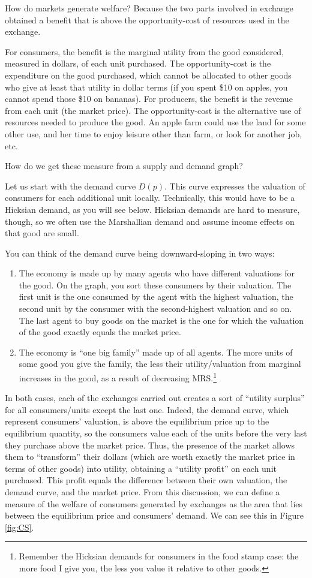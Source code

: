 \documentclass[11pt,english]{article}
\begin{document}
How do markets generate welfare? Because the two parts involved in exchange obtained a benefit that is above the opportunity-cost of resources used in the exchange.

For consumers, the benefit is the marginal utility from the good considered, measured in dollars, of each unit purchased. The opportunity-cost is the expenditure on the good purchased, which cannot be allocated to other goods who give at least that utility in dollar terms (if you spent \$10 on apples, you cannot spend those \$10 on bananas). For producers, the benefit is the revenue from each unit (the market price). The opportunity-cost is the alternative use of resources needed to produce the good. An apple farm could use the land for some other use, and her time to enjoy leisure other than farm, or look for another job, etc.

How do we get these measure from a supply and demand graph? 


Let us start with the demand curve $D(p)$. This curve expresses the valuation of consumers for each additional unit locally. Technically, this would have to be a Hicksian demand, as you will see below. Hicksian demands are hard to measure, though, so we often use the Marshallian demand and assume income effects on that good are small.

 You can think of the demand curve being downward-sloping in two ways:
\begin{enumerate}
	\item The economy is made up by many agents who have different valuations for the good. On the graph, you sort these consumers by their valuation. The first unit is the one consumed by the agent with the highest valuation, the second unit by the consumer with the second-highest valuation and so on. The last agent to buy goods on the market is the one for which the valuation of the good exactly equals the market price.
	\item The economy is ``one big family'' made up of all agents. The more units of some good you give the family, the less their utility/valuation from marginal increases in the good, as a result of decreasing MRS.\footnote{Remember the Hicksian demands for consumers in the food stamp case: the more food I give you, the less you value it relative to other goods.}
\end{enumerate}
In both cases, each of the exchanges carried out creates a sort of ``utility surplus'' for all consumers/units except the last one. Indeed, the demand curve, which represent consumers' valuation, is above the equilibrium price up to the equilibrium quantity, so the consumers value each of the units before the very last they purchase above the market price. Thus, the presence of the market allows them to ``transform'' their dollars (which are worth exactly the market price in terms of other goods) into utility, obtaining a ``utility profit'' on each unit purchased. This profit equals the difference between their own valuation, the demand curve, and the market price. From this discussion, we can define a measure of the welfare of consumers generated by exchanges as the area that lies between the equilibrium price and consumers' demand. We can see this in Figure \ref{fig:CS}.
\end{document}
